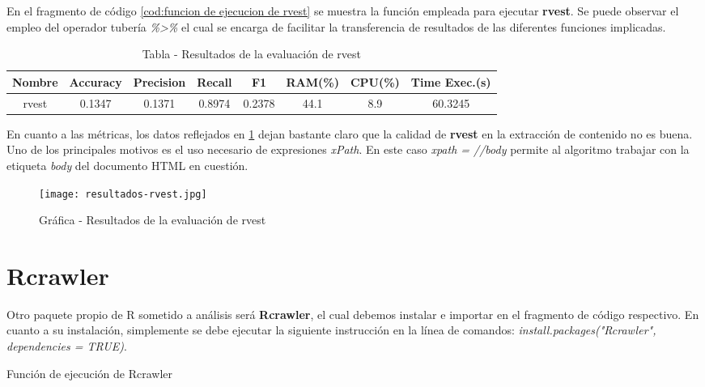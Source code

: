 En el fragmento de código \ref{cod:funcion de ejecucion de rvest} se muestra la función empleada para
ejecutar \textbf{rvest}. Se puede observar el empleo del operador tubería \emph{\%>\%} el cual se encarga
de facilitar la transferencia de resultados de las diferentes funciones implicadas.

\begin{table}[h]
    \begin{center}
      \begin{tabular}{| c | c | c | c | c | c | c | c |} \hline 
       \textbf{Nombre} & \textbf{Accuracy} & \textbf{Precision}  & \textbf{Recall} & \textbf{F1} & \textbf{RAM(\%)} & \textbf{CPU(\%)} & \textbf{Time Exec.(s)} \\ \hline
       rvest & 0.1347 & 0.1371 & 0.8974 & 0.2378 & 44.1 & 8.9 & 60.3245 \\ \hline
      \end{tabular}
      \caption{Tabla - Resultados de la evaluación de rvest}
      \label{tab:tabla - resultados de la evaluacion de rvest}
    \end{center}
\end{table}

En cuanto a las métricas, los datos reflejados en \ref{tab:tabla - resultados de la evaluacion de rvest}
dejan bastante claro que la calidad de \textbf{rvest} en la extracción de contenido no es buena. Uno de
los principales motivos es el uso necesario de expresiones \emph{xPath}. En este caso \emph{xpath = //body} 
permite al algoritmo trabajar con la etiqueta \emph{body} del documento HTML en cuestión.

\begin{figure}[tphb]
    \centering
    \texttt{[image: resultados-rvest.jpg]}
    \caption{Gráfica - Resultados de la evaluación de rvest}
    \label{img:grafica - resultados de la evaluacion de rvest}
\end{figure}

\section*{Rcrawler}

Otro paquete propio de R sometido a análisis será \textbf{Rcrawler}, el cual debemos instalar e importar
en el fragmento de código respectivo. En cuanto a su instalación, simplemente se debe ejecutar la siguiente
instrucción en la línea de comandos: \emph{install.packages("Rcrawler", dependencies = TRUE)}.

\begin{codefloat}
    
    \caption{Función de ejecución de Rcrawler}
    \label{cod:funcion de ejecucion de rcrawler}
\end{codefloat}


